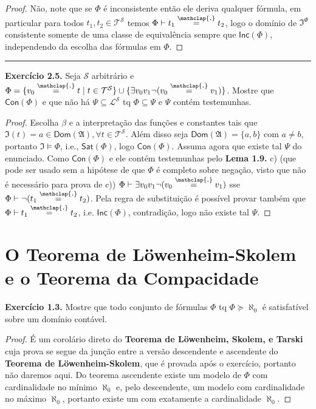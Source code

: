 \documentclass[11pt]{article}
\newcommand{\mc}[1]{\mathcal{#1}}
\newcommand{\mf}[1]{\mathfrak{#1}}
\newcommand{\msf}[1]{\mathsf{#1}}
\newcommand\overtext[2]{\stackrel{\mathclap{\normalfont\mbox{#1}}}{#2}}
\begin{document}
\begin{proof}
    Não, note que se $\Phi$ é inconsistente então ele deriva qualquer fórmula, em particular para todos $t_1,t_2\in\mc{T}^\mc{S}$ temos $\Phi\vdash t_1\overtext{.}{=}t_2$, logo o domínio de $\mf{I}^\Phi$ consistente somente de uma classe de equivalência sempre que $\msf{Inc}(\Phi)$, independendo da escolha das fórmulas em $\Phi$.
\end{proof}

\hrule

\begin{shaded}
\textbf{Exercício 2.5.} Seja $\mc{S}$ arbitrário e $\Phi=\{v_0\overtext{.}{=}t\mid t\in\mc{T}^\mc{S}\}\cup\{\exists v_0v_1\neg(v_0\overtext{.}{=}v_1)\}$. Mostre que $\msf{Con}(\Phi)$ e que não há $\Psi\subseteq\mc{L}^\mc{S}$ tq $\Phi\subseteq\Psi$ e $\Psi$ contém testemunhas.
\end{shaded}

\begin{proof}
    Escolha $\beta$ e a interpretação das funções e constantes tais que $\mf{I}(t)=a\in\msf{Dom}(\mf{A}),\forall t\in\mc{T}^\mc{S}$. Além disso seja $\msf{Dom}(\mf{A})=\{a,b\}$ com $a\ne b$, portanto $\mf{I}\vDash\Phi$, i.e., $\msf{Sat}(\Phi)$, logo $\msf{Con}(\Phi)$. Assuma agora que existe tal $\Psi$ do enunciado. Como $\msf{Con}(\Phi)$ e ele contém testemunhas pelo \textbf{Lema 1.9.} c) (que pode ser usado sem a hipótese de que $\Phi$ é completo sobre negação, visto que não é necessário para prova de c)) $\Phi\vdash\exists v_0v_1\neg(v_0\overtext{.}{=}v_1)$ sse $\Phi\vdash\neg(t_1\overtext{.}{=}t_2)$. Pela regra de substituição é possível provar também que $\Phi\vdash t_1\overtext{.}{=}t_2$, i.e. $\msf{Inc}(\Phi)$, contradição, logo não existe tal $\Psi$.
\end{proof}

\section{O Teorema de Löwenheim-Skolem e o Teorema da Compacidade}

\begin{shaded}
\textbf{Exercício 1.3.} Mostre que todo conjunto de fórmulas $\Phi$ tq $\Phi\succeq\aleph_0$ é satisfatível sobre um domínio contável.
\end{shaded}

\begin{proof}
    É um corolário direto do \textbf{Teorema de Löwenheim, Skolem, e Tarski} cuja prova se segue da junção entre a versão descendente e ascendente do \textbf{Teorema de Löwenheim-Skolem}, que é provada após o exercício, portanto não daremos aqui. Do teorema ascendente existe um modelo de $\Phi$ com cardinalidade no mínimo $\aleph_0$ e, pelo descendente, um modelo com cardinalidade no máximo $\aleph_0$, portanto existe um com exatamente a cardinalidade $\aleph_0$.
\end{proof}
\end{document}
